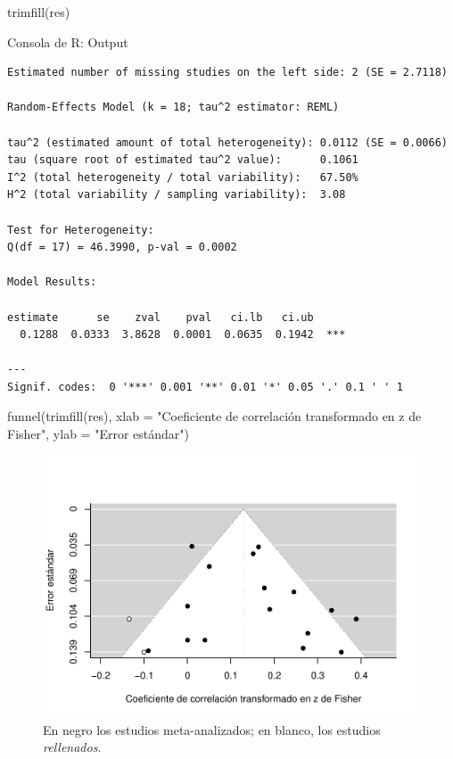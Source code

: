\documentclass[
  bookmarksnumbered]{article}
\newenvironment{Shaded}{\begin{snugshade}}{\end{snugshade}}
\newcommand{\AttributeTok}[1]{\textcolor[rgb]{0.00,0.34,0.68}{#1}}
\newcommand{\FunctionTok}[1]{\textcolor[rgb]{0.39,0.29,0.61}{#1}}
\newcommand{\NormalTok}[1]{\textcolor[rgb]{0.12,0.11,0.11}{#1}}
\newcommand{\StringTok}[1]{\textcolor[rgb]{0.75,0.01,0.01}{#1}}
\begin{document}
\begin{Shaded}
\begin{Highlighting}[]
\FunctionTok{trimfill}\NormalTok{(res)}
\end{Highlighting}
\end{Shaded}

\begin{ROut}{Consola de R: Output~\thetcbcounter}
                \begin{footnotesize}
                \begin{verbatim} 
Estimated number of missing studies on the left side: 2 (SE = 2.7118)

Random-Effects Model (k = 18; tau^2 estimator: REML)

tau^2 (estimated amount of total heterogeneity): 0.0112 (SE = 0.0066)
tau (square root of estimated tau^2 value):      0.1061
I^2 (total heterogeneity / total variability):   67.50%
H^2 (total variability / sampling variability):  3.08

Test for Heterogeneity:
Q(df = 17) = 46.3990, p-val = 0.0002

Model Results:

estimate      se    zval    pval   ci.lb   ci.ub 
  0.1288  0.0333  3.8628  0.0001  0.0635  0.1942  *** 

---
Signif. codes:  0 '***' 0.001 '**' 0.01 '*' 0.05 '.' 0.1 ' ' 1
 \end{verbatim}
                \end{footnotesize}
                \end{ROut}

\begin{Shaded}
\begin{Highlighting}[]
\FunctionTok{funnel}\NormalTok{(}\FunctionTok{trimfill}\NormalTok{(res), }
       \AttributeTok{xlab =} \StringTok{"Coeficiente de correlación transformado en z de Fisher"}\NormalTok{,}
       \AttributeTok{ylab =} \StringTok{"Error estándar"}\NormalTok{)}
\end{Highlighting}
\end{Shaded}

\begin{figure}
\centering
\includegraphics{Meta-analysis_files/figure-latex/unnamed-chunk-21-1.pdf}
\caption{\label{fig:unnamed-chunk-21}En negro los estudios meta-analizados; en blanco, los estudios \emph{rellenados}.}
\end{figure}
\end{document}
